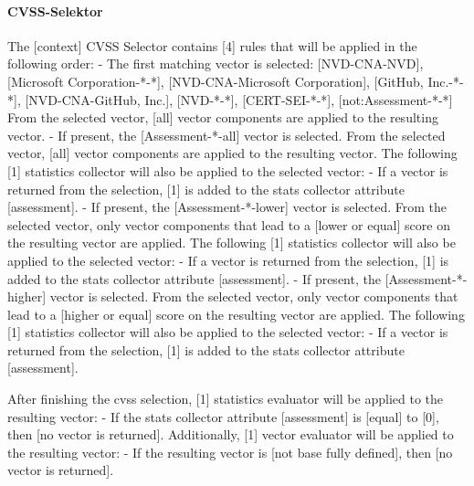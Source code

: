 \paragraph{CVSS-Selektor } \label{par:projektbericht-loesungsweg-cvss-selection-example-selector-context}

The [context] CVSS Selector contains [4] rules that will be applied in the following order:\newline
- The first matching vector is selected: [NVD-CNA-NVD], [Microsoft Corporation-*-*], [NVD-CNA-Microsoft Corporation], [GitHub, Inc.-*-*], [NVD-CNA-GitHub, Inc.], [NVD-*-*], [CERT-SEI-*-*], [not:Assessment-*-*]\newline
From the selected vector, [all] vector components are applied to the resulting vector.\newline
- If present, the [Assessment-*-all] vector is selected.\newline
From the selected vector, [all] vector components are applied to the resulting vector.\newline
The following [1] statistics collector will also be applied to the selected vector:\newline
- If a vector is returned from the selection, [1] is added to the stats collector attribute [assessment].\newline
- If present, the [Assessment-*-lower] vector is selected.\newline
From the selected vector, only vector components that lead to a [lower or equal] score on the resulting vector are applied.\newline
The following [1] statistics collector will also be applied to the selected vector:\newline
- If a vector is returned from the selection, [1] is added to the stats collector attribute [assessment].\newline
- If present, the [Assessment-*-higher] vector is selected.\newline
From the selected vector, only vector components that lead to a [higher or equal] score on the resulting vector are applied.\newline
The following [1] statistics collector will also be applied to the selected vector:\newline
- If a vector is returned from the selection, [1] is added to the stats collector attribute [assessment].

After finishing the cvss selection, [1] statistics evaluator will be applied to the resulting vector:\newline
- If the stats collector attribute [assessment] is [equal] to [0], then [no vector is returned].\newline
Additionally, [1] vector evaluator will be applied to the resulting vector:\newline
- If the resulting vector is [not base fully defined], then [no vector is returned].

